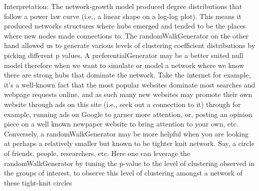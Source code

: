 \documentclass[11pt]{article}
\begin{document}
    Interpretation: The network-growth model produced degree distributions
that follow a power law curve (i.e., a linear shape on a log-log plot).
This means it produced networks structures where hubs emerged and tended
to be the places where new nodes made connections to. The
randomWalkGenerator on the other hand allowed us to generate various
levels of clustering coefficient distributions by picking different p
values. A preferentialGenerator may be a better suited null model
therefore when we want to simulate or model a network where we know
there are strong hubs that dominate the network. Take the internet for
example, it's a well-known fact that the most popular websites dominate
most searches and webpage requests online, and as such many new websites
may promote their own website through ads on this site (i.e., seek out a
connection to it) through for example, running ads on Google to garner
more attention, or, posting an opinion piece on a well known newpaper
website to bring attention to your own, etc. Conversely, a
randomWalkGenerator may be more helpful when you are looking at perhaps
a relatively smaller but known to be tighter knit network. Say, a circle
of friends, people, researchers, etc. Here one can leverage the
randomWalkGenerator by tuning the p-value to the level of clustering
observed in the groups of interest, to observe this level of clustering
amongst a network of these tight-knit circles
\end{document}

